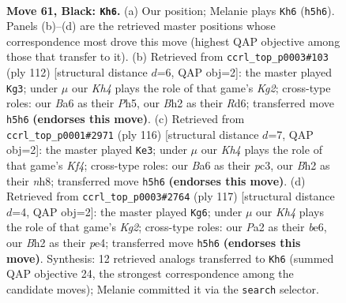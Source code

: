 \documentclass[11pt]{article}
\begin{document}
\clearpage

\begin{figure}[p]\centering
\begin{subfigure}{0.46\textwidth}\centering
\resizebox{\linewidth}{!}{%
\newchessgame
\chessboard[
  setfen={6K1/8/b7/6pk/8/8/p6b/8 b - - 1 61},
  showmover=false,
  pgfstyle=straightmove, color=movearrow, markmove={h5-h6}
]}
\caption{}
\end{subfigure}\hfill
\begin{subfigure}{0.46\textwidth}\centering
\resizebox{\linewidth}{!}{%
\newchessgame
\chessboard[
  setfen={6k1/1r6/3R4/7P/8/5P2/6K1/8 w - - 1 57},
  showmover=false,
  pgfstyle=straightmove, color=movearrow, markmove={g2-g3}
]}
\caption{}
\end{subfigure}
\\[4pt]
\begin{subfigure}{0.46\textwidth}\centering
\resizebox{\linewidth}{!}{%
\newchessgame
\chessboard[
  setfen={3k3n/8/5P2/8/5KP1/2p5/8/8 w - - 0 59},
  showmover=false,
  pgfstyle=straightmove, color=movearrow, markmove={f4-e3}
]}
\caption{}
\end{subfigure}\hfill
\begin{subfigure}{0.46\textwidth}\centering
\resizebox{\linewidth}{!}{%
\newchessgame
\chessboard[
  setfen={1b6/6k1/4B2p/8/4P3/8/4K3/8 b - - 4 59},
  showmover=false,
  pgfstyle=straightmove, color=movearrow, markmove={g7-g6}
]}
\caption{}
\end{subfigure}
\caption{\textbf{Move 61, Black: \texttt{Kh6}.} (a) Our position; Melanie plays \texttt{Kh6} (\texttt{h5h6}). Panels (b)--(d) are the retrieved master positions whose correspondence most drove this move (highest QAP objective among those that transfer to it). (b) Retrieved from \texttt{ccrl\_top\_p0003\#103} (ply 112) [structural distance $d$=6, QAP obj=2]: the master played \texttt{Kg3}; under $\mu$ our \emph{Kh4} plays the role of that game's \emph{Kg2}; cross-type roles: our \emph{B}a6 as their \emph{P}h5, our \emph{B}h2 as their \emph{R}d6; transferred move \texttt{h5h6} \textbf{(endorses this move)}. (c) Retrieved from \texttt{ccrl\_top\_p0001\#2971} (ply 116) [structural distance $d$=7, QAP obj=2]: the master played \texttt{Ke3}; under $\mu$ our \emph{Kh4} plays the role of that game's \emph{Kf4}; cross-type roles: our \emph{B}a6 as their \emph{p}c3, our \emph{B}h2 as their \emph{n}h8; transferred move \texttt{h5h6} \textbf{(endorses this move)}. (d) Retrieved from \texttt{ccrl\_top\_p0003\#2764} (ply 117) [structural distance $d$=4, QAP obj=2]: the master played \texttt{Kg6}; under $\mu$ our \emph{Kh4} plays the role of that game's \emph{Kg2}; cross-type roles: our \emph{P}a2 as their \emph{b}e6, our \emph{B}h2 as their \emph{p}e4; transferred move \texttt{h5h6} \textbf{(endorses this move)}. Synthesis: 12 retrieved analogs transferred to \texttt{Kh6} (summed QAP objective 24, the strongest correspondence among the candidate moves); Melanie committed it via the \texttt{search} selector.}
\label{fig:thought-m121}
\end{figure}
\end{document}
